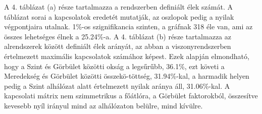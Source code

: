 \documentclass[12pt,bibliography=totoc]{article}
\begin{document}

\bigskip

A 4. táblázat (a) része tartalmazza a rendszerben definiált élek számát. A táblázat sorai a kapcsolatok eredetét mutatják, az oszlopok pedig a nyilak végpontjaira utalnak. 1\%-os szignifikancia szinten, a gráfnak 318 éle van, ami az összes lehetséges élnek a 25.24\%-a. A 4. táblázat (b) része tartalmazza az alrendszerek között definiált élek arányát, az abban a viszonyrendszerben értelmezett maximális kapcsolatok számához képest. Ezek alapján elmondható, hogy a Szint és Görbület közötti okság a legsűrűbb, 36.1\%, ezt követi a Meredekség és Görbület közötti összekö-töttség, 31.94\%-kal, a harmadik helyen pedig a Szint alhálózat alatt értelmezett nyilak aránya áll, 31.06\%-kal. A kapcsolati mátrix nem szimmetrikus a főátlóra, a Görbület faktorokból, összesítve kevesebb nyíl irányul mind az alhálózaton belülre, mind kívülre.


\end{document}
